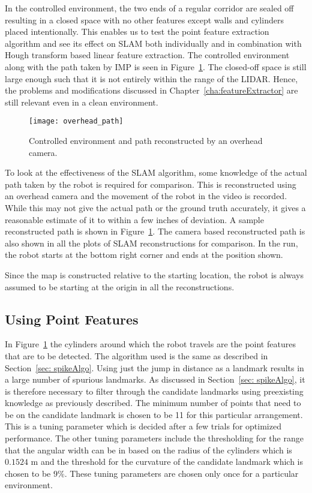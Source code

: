 In the controlled environment, the two ends of a regular corridor are sealed off resulting in a closed space with no other features except walls and cylinders placed intentionally. This enables us to test the point feature extraction algorithm and see its effect on SLAM both individually and in combination with Hough transform based linear feature extraction. The controlled environment along with the path taken by IMP is seen in Figure~\ref{fig:overhead_path}. The closed-off space is still large enough such that it is not entirely within the range of the LIDAR. Hence, the problems and modifications discussed in Chapter~\ref{cha:featureExtractor} are still relevant even in a clean environment. 
\begin{figure}
\centering
\texttt{[image: overhead\_path]}
\caption{Controlled environment and path reconstructed by an overhead camera.}
\label{fig:overhead_path}
\end{figure}
To look at the effectiveness of the SLAM algorithm, some knowledge of the actual path taken by the robot is required for comparison. This is reconstructed using an overhead camera and the movement of the robot in the video is recorded. While this may not give the actual path or the ground truth accurately, it gives a reasonable estimate of it to within a few inches of deviation. A sample reconstructed path is shown in Figure~\ref{fig:overhead_path}. The camera based reconstructed path is also shown in all the plots of SLAM reconstructions for comparison. In the run, the robot starts at the bottom right corner and ends at the position shown.

Since the map is constructed relative to the starting location, the robot is always assumed to be starting at the origin in all the reconstructions.

\subsection{Using Point Features}
\label{sec: point_result}
In Figure~\ref{fig:overhead_path} the cylinders around which the robot travels are the point features that are to be detected. The algorithm used is the same as described in Section~\ref{sec: spikeAlgo}. Using just the jump in distance as a landmark results in a large number of spurious landmarks. As discussed in Section~\ref{sec: spikeAlgo}, it is therefore necessary to filter through the candidate landmarks using preexisting knowledge as previously described. The minimum number of points that need to be on the candidate landmark is chosen to be 11 for this particular arrangement. This is a tuning parameter which is decided after a few trials for optimized performance. The other tuning parameters include the thresholding for the range that the angular width can be in based on the radius of the cylinders which is $ 0.1524 $ m and the threshold for the curvature of the candidate landmark which is chosen to be $ 9 \% $. These tuning parameters are chosen only once for a particular environment. 

